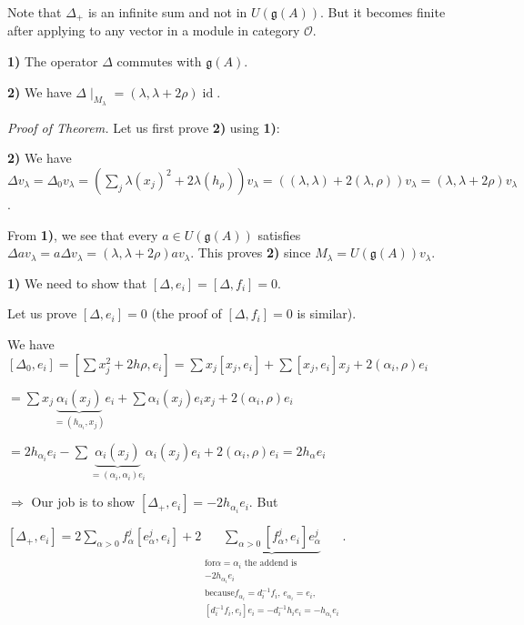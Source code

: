 \documentclass[etingof-lie.tex]{subfiles}
\begin{document}
Note that $\Delta_{+}$ is an infinite sum and not in $U\left(  \mathfrak{g}%
\left(  A\right)  \right)  $. But it becomes finite after applying to any
vector in a module in category $\mathcal{O}$.

\begin{theorem}
\textbf{1)} The operator $\Delta$ commutes with $\mathfrak{g}\left(  A\right)
$.

\textbf{2)} We have $\Delta\mid_{M_{\lambda}}=\left(  \lambda,\lambda
+2\rho\right)  \operatorname*{id}$.
\end{theorem}

\textit{Proof of Theorem.} Let us first prove \textbf{2)} using \textbf{1)}:

\textbf{2)} We have $\Delta v_{\lambda}=\Delta_{0}v_{\lambda}=\left(
\sum\limits_{j}\lambda\left(  x_{j}\right)  ^{2}+2\lambda\left(  h_{\rho
}\right)  \right)  v_{\lambda}=\left(  \left(  \lambda,\lambda\right)
+2\left(  \lambda,\rho\right)  \right)  v_{\lambda}=\left(  \lambda
,\lambda+2\rho\right)  v_{\lambda}$.

From \textbf{1)}, we see that every $a\in U\left(  \mathfrak{g}\left(
A\right)  \right)  $ satisfies $\Delta av_{\lambda}=a\Delta v_{\lambda
}=\left(  \lambda,\lambda+2\rho\right)  av_{\lambda}$. This proves \textbf{2)}
since $M_{\lambda}=U\left(  \mathfrak{g}\left(  A\right)  \right)  v_{\lambda
}$.

\textbf{1)} We need to show that $\left[  \Delta,e_{i}\right]  =\left[
\Delta,f_{i}\right]  =0$.

Let us prove $\left[  \Delta,e_{i}\right]  =0$ (the proof of $\left[
\Delta,f_{i}\right]  =0$ is similar).

We have $\left[  \Delta_{0},e_{i}\right]  =\left[  \sum x_{j}^{2}+2h\rho
,e_{i}\right]  =\sum x_{j}\left[  x_{j},e_{i}\right]  +\sum\left[  x_{j}%
,e_{i}\right]  x_{j}+2\left(  \alpha_{i},\rho\right)  e_{i}$

$=\sum x_{j}\underbrace{\alpha_{i}\left(  x_{j}\right)  }_{=\left(
h_{\alpha_{i}},x_{j}\right)  }e_{i}+\sum\alpha_{i}\left(  x_{j}\right)
e_{i}x_{j}+2\left(  \alpha_{i},\rho\right)  e_{i}$

$=2h_{\alpha_{i}}e_{i}-\sum\underbrace{\alpha_{i}\left(  x_{j}\right)
}_{=\left(  \alpha_{i},\alpha_{i}\right)  e_{i}}\alpha_{i}\left(
x_{j}\right)  e_{i}+2\left(  \alpha_{i},\rho\right)  e_{i}=2h_{\alpha}e_{i}$

$\Longrightarrow$ Our job is to show $\left[  \Delta_{+},e_{i}\right]
=-2h_{\alpha_{i}}e_{i}$. But

$\left[  \Delta_{+},e_{i}\right]  =2\sum\limits_{\alpha>0}f_{\alpha}%
^{j}\left[  e_{\alpha}^{j},e_{i}\right]  +2\underbrace{\sum\limits_{\alpha
>0}\left[  f_{\alpha}^{j},e_{i}\right]  e_{\alpha}^{j}}_{\substack{\text{for
}\alpha=\alpha_{i}\text{ the addend is}\\-2h_{\alpha_{i}}e_{i}\\\text{because
}f_{\alpha_{i}}=d_{i}^{-1}f_{i}\text{, }e_{\alpha_{i}}=e_{i}\text{,}\\\left[
d_{i}^{-1}f_{i},e_{i}\right]  e_{i}=-d_{i}^{-1}h_{i}e_{i}=-h_{\alpha_{i}}%
e_{i}}}$.
\end{document}
